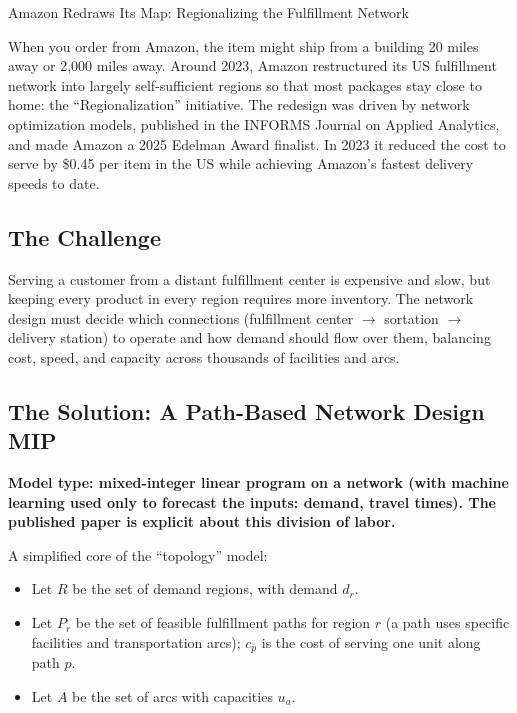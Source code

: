 \begin{casestudybox}{Amazon Redraws Its Map: Regionalizing the Fulfillment Network}

When you order from Amazon, the item might ship from a building 20 miles away or 2{,}000 miles away.  Around 2023, Amazon restructured its US fulfillment network into largely self-sufficient regions so that most packages stay close to home: the ``Regionalization'' initiative.  The redesign was driven by network optimization models, published in the INFORMS Journal on Applied Analytics, and made Amazon a 2025 Edelman Award finalist.  In 2023 it reduced the cost to serve by \$0.45 per item in the US while achieving Amazon's fastest delivery speeds to date.

\subsection*{The Challenge}
Serving a customer from a distant fulfillment center is expensive and slow, but keeping every product in every region requires more inventory.  The network design must decide which connections (fulfillment center $\to$ sortation $\to$ delivery station) to operate and how demand should flow over them, balancing cost, speed, and capacity across thousands of facilities and arcs.

\subsection*{The Solution: A Path-Based Network Design MIP}
\textbf{Model type: mixed-integer linear program on a network (with machine learning used only to forecast the inputs: demand, travel times).  The published paper is explicit about this division of labor.}

A simplified core of the ``topology'' model:

\begin{itemize}
\item Let $R$ be the set of demand regions, with demand $d_r$.
\item Let $P_r$ be the set of feasible fulfillment paths for region $r$ (a path uses specific facilities and transportation arcs); $c_p$ is the cost of serving one unit along path $p$.
\item Let $A$ be the set of arcs with capacities $u_a$.
\end{itemize}


\end{casestudybox}
